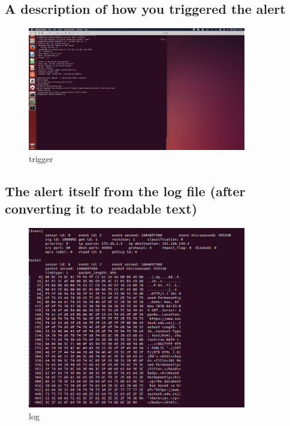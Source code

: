 \documentclass[onecolumn,oneside]{SUSTechHomework}
\begin{document}
    \subsection{A description of how you triggered the alert}

      \begin{figure}[H]
        \centering
        \includegraphics[width=0.85\textwidth]{img/pic2.png}
        \caption{trigger}
      \end{figure}

    \subsection{The alert itself from the log file (after converting it to readable text)}

      \begin{figure}[H]
        \centering
        \includegraphics[width=0.85\textwidth]{img/pic3.png}
        \caption{log}
      \end{figure}
  
\end{document}
